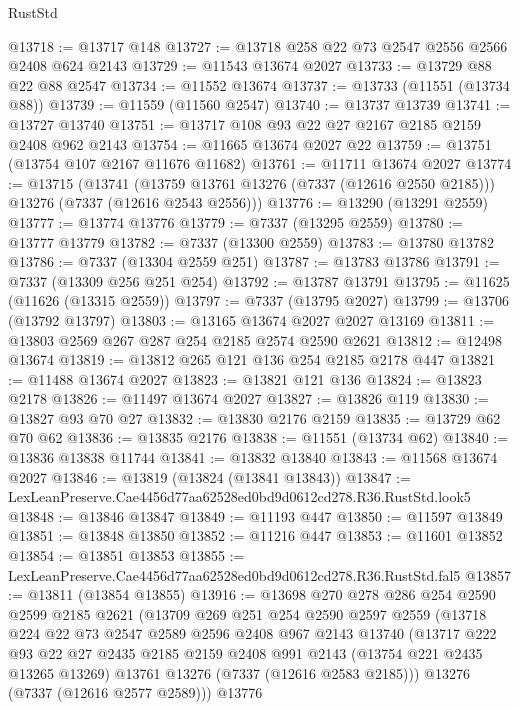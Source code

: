 \begin{lexlean}{RustStd}
\begin{coremodule}
@13718 := @13717 @148
@13727 := @13718 @258 @22 @73 @2547 @2556 @2566 @2408 @624 @2143
@13729 := @11543 @13674 @2027
@13733 := @13729 @88 @22 @88 @2547
@13734 := @11552 @13674
@13737 := @13733 (@11551 (@13734 @88))
@13739 := @11559 (@11560 @2547)
@13740 := @13737 @13739
@13741 := @13727 @13740
@13751 := @13717 @108 @93 @22 @27 @2167 @2185 @2159 @2408 @962 @2143
@13754 := @11665 @13674 @2027 @22
@13759 := @13751 (@13754 @107 @2167 @11676 @11682)
@13761 := @11711 @13674 @2027
@13774 := @13715
    (@13741 (@13759 @13761 @13276 (@7337 (@12616 @2550 @2185))) @13276 (@7337 (@12616 @2543 @2556)))
@13776 := @13290 (@13291 @2559)
@13777 := @13774 @13776
@13779 := @7337 (@13295 @2559)
@13780 := @13777 @13779
@13782 := @7337 (@13300 @2559)
@13783 := @13780 @13782
@13786 := @7337 (@13304 @2559 @251)
@13787 := @13783 @13786
@13791 := @7337 (@13309 @256 @251 @254)
@13792 := @13787 @13791
@13795 := @11625 (@11626 (@13315 @2559))
@13797 := @7337 (@13795 @2027)
@13799 := @13706 (@13792 @13797)
@13803 := @13165 @13674 @2027 @2027 @13169
@13811 := @13803 @2569 @267 @287 @254 @2185 @2574 @2590 @2621
@13812 := @12498 @13674
@13819 := @13812 @265 @121 @136 @254 @2185 @2178 @447
@13821 := @11488 @13674 @2027
@13823 := @13821 @121 @136
@13824 := @13823 @2178
@13826 := @11497 @13674 @2027
@13827 := @13826 @119
@13830 := @13827 @93 @70 @27
@13832 := @13830 @2176 @2159
@13835 := @13729 @62 @70 @62
@13836 := @13835 @2176
@13838 := @11551 (@13734 @62)
@13840 := @13836 @13838 @11744
@13841 := @13832 @13840
@13843 := @11568 @13674 @2027
@13846 := @13819 (@13824 (@13841 @13843))
@13847 := LexLeanPreserve.Cae4456d77aa62528ed0bd9d0612cd278.R36.RustStd.look5
@13848 := @13846 @13847
@13849 := @11193 @447
@13850 := @11597 @13849
@13851 := @13848 @13850
@13852 := @11216 @447
@13853 := @11601 @13852
@13854 := @13851 @13853
@13855 := LexLeanPreserve.Cae4456d77aa62528ed0bd9d0612cd278.R36.RustStd.fal5
@13857 := @13811 (@13854 @13855)
@13916 := @13698
    @270
    @278
    @286
    @254
    @2590
    @2599
    @2185
    @2621
    (@13709
      @269
      @251
      @254
      @2590
      @2597
      @2559
      (@13718
        @224
        @22
        @73
        @2547
        @2589
        @2596
        @2408
        @967
        @2143
        @13740
        (@13717
          @222
          @93
          @22
          @27
          @2435
          @2185
          @2159
          @2408
          @991
          @2143
          (@13754 @221 @2435 @13265 @13269)
          @13761
          @13276
          (@7337 (@12616 @2583 @2185)))
        @13276
        (@7337 (@12616 @2577 @2589)))
      @13776

\end{coremodule}
\end{lexlean}

